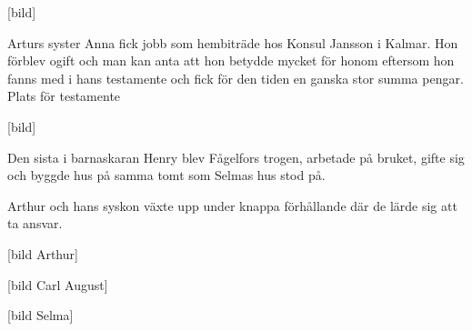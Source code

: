 [bild]

Arturs syster Anna fick jobb som hembiträde hos Konsul Jansson i Kalmar. Hon förblev ogift och man kan anta att hon betydde mycket för honom eftersom hon fanns med i hans testamente och fick för den tiden en ganska stor summa pengar.
Plats för testamente

[bild]

Den sista i barnaskaran Henry blev Fågelfors trogen, arbetade på bruket, gifte sig och byggde hus på samma tomt som Selmas hus stod på.

Arthur och hans syskon växte upp under knappa förhållande där de lärde sig att ta ansvar.

[bild Arthur]

[bild Carl August]

[bild Selma]

